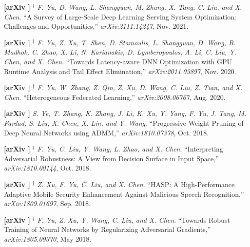 	\textbf{[arXiv ]}
	$^\dagger$
	\textsl{F. Yu, D. Wang, L. Shangguan, M. Zhang, X. Tang, C. Liu, and X. Chen}.
		``A Survey of Large-Scale Deep Learning Serving System Optimization: Challenges and Opportunities,''
		\textsl{arXiv:2111.14247}, Nov. 2021.
			\vspace{-3mm}

	\textbf{[arXiv ]}
	$^\dagger$
	\textsl{F. Yu, Z. Xu, T. Shen, D. Stamoulis, L. Shangguan, D. Wang, R. Madhok, C. Zhao, X. Li, N. Karianakis, D. Lymberopoulos, A. Li, C. Liu, Y. Chen, and X. Chen}.
		``Towards Latency-aware DNN Optimization with GPU Runtime Analysis and Tail Effect Elimination,''
		\textsl{arXiv:2011.03897}, Nov. 2020.
			\vspace{-3mm}

	\textbf{[arXiv ]}
	$^\dagger$
	\textsl{F. Yu, W. Zhang, Z. Qin, Z. Xu, D. Wang, C. Liu, Z. Tian, and X. Chen}.
		``Heterogeneous Federated Learning,''
		\textsl{arXiv:2008.06767}, Aug. 2020.
			\vspace{-3mm}

	\textbf{[arXiv ]}\hspace{2mm}
	\textsl{S. Ye, T. Zhang, K. Zhang, J. Li, K. Xu, Y. Yang, F. Yu, J. Tang, M. Fardad, S. Liu, X. Chen, X. Lin, and Y. Wang}.
		``Progressive Weight Pruning of Deep Neural Networks using ADMM,''
		\textsl{arXiv:1810.07378}, Oct. 2018.
			\vspace{-3mm}

	\textbf{[arXiv ]}
	$^\dagger$
	\textsl{F. Yu, C. Liu, Y. Wang, L. Zhao, and X. Chen}.
		``Interpreting Adversarial Robustness: A View from Decision Surface in Input Space,''
		\textsl{arXiv:1810.00144}, Oct. 2018.
			\vspace{-3mm}

	\textbf{[arXiv ]}
	$^\dagger$
	\textsl{Z. Xu, F. Yu, C. Liu, and X. Chen}.
		``HASP: A High-Performance Adaptive Mobile Security Enhancement Against Malicious Speech Recognition,''
		\textsl{arXiv:1809.01697}, Sep. 2018.
			\vspace{-3mm}

	\textbf{[arXiv ]}
	$^\dagger$
	\textsl{F. Yu, Z. Xu, Y. Wang, C. Liu, and X. Chen}.
		``Towards Robust Training of Neural Networks by Regularizing Adversarial Gradients,''
		\textsl{arXiv:1805.09370}, May 2018.
			\vspace{-3mm}

			\vspace{3mm}
